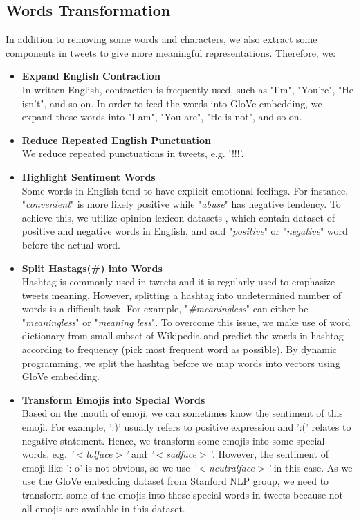 \documentclass[10pt,conference,compsocconf]{IEEEtran}
\begin{document}
\subsection{Words Transformation}
In addition to removing some words and characters, we also extract some components in tweets to give more meaningful representations. Therefore, we:
\begin{itemize}
\item \textbf{Expand English Contraction} \\
In written English, contraction is frequently used, such as "I'm", "You're", "He isn't", and so on. In order to feed the words into GloVe embedding, we expand these words into "I am", "You are", "He is not", and so on.
\item \textbf{Reduce Repeated English Punctuation} \\
We reduce repeated punctuations in tweets, e.g. '!!!'.
\item \textbf{Highlight Sentiment Words} \\
Some words in English tend to have explicit emotional feelings. For instance, "\textit{convenient}" is more likely positive while "\textit{abuse}" has negative tendency. To achieve this, we utilize opinion lexicon datasets \cite{Minging}, which contain dataset of positive and negative words in English, and add "\textit{positive}" or "\textit{negative}" word before the actual word.
\item \textbf{Split Hastags({\#}) into Words} \\
Hashtag is commonly used in tweets and it is regularly used to emphasize tweets meaning. However, splitting a hashtag into undetermined number of words is a difficult task. For example, "\textit{\#meaningless}" can either be "\textit{meaningless}" or "\textit{meaning less}". To overcome this issue, we make use of word dictionary from small subset of Wikipedia and predict the words in hashtag according to frequency (pick most frequent word as possible). By dynamic programming, we split the hashtag before we map words into vectors using GloVe embedding.
\item \textbf{Transform Emojis into Special Words} \\
Based on the mouth of emoji, we can sometimes know the sentiment of this emoji. For example, ':)' usually refers to positive expression and ':(' relates to negative statement. Hence, we transform some emojis into some special words, e.g. \textit{'$<$lolface$>$'} and \textit{'$<$sadface$>$'}. However, the sentiment of emoji like ':-o' is not obvious, so we use \textit{'$<$neutralface$>$'} in this case. As we use the GloVe embedding dataset from Stanford NLP group, we need to transform some of the emojis into these special words in tweets because not all emojis are available in this dataset.
\end{itemize}
\end{document}
